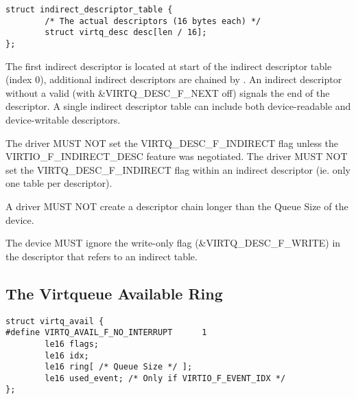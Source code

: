 \begin{lstlisting}
struct indirect_descriptor_table {
        /* The actual descriptors (16 bytes each) */
        struct virtq_desc desc[len / 16];
};
\end{lstlisting}

The first indirect descriptor is located at start of the indirect
descriptor table (index 0), additional indirect descriptors are
chained by . An indirect descriptor without a valid 
(with \&VIRTQ_DESC_F_NEXT off) signals the end of the descriptor.
A single indirect descriptor
table can include both device-readable and device-writable descriptors.

The driver MUST NOT set the VIRTQ_DESC_F_INDIRECT flag unless the
VIRTIO_F_INDIRECT_DESC feature was negotiated.   The driver MUST NOT
set the VIRTQ_DESC_F_INDIRECT flag within an indirect descriptor (ie. only
one table per descriptor).

A driver MUST NOT create a descriptor chain longer than the Queue Size of
the device.

The device MUST ignore the write-only flag (\&VIRTQ_DESC_F_WRITE) in the descriptor that refers to an indirect table.

\subsection{The Virtqueue Available Ring}\label{sec:Basic Facilities of a Virtio Device / Virtqueues / The Virtqueue Available Ring}

\begin{lstlisting}
struct virtq_avail {
#define VIRTQ_AVAIL_F_NO_INTERRUPT      1
        le16 flags;
        le16 idx;
        le16 ring[ /* Queue Size */ ];
        le16 used_event; /* Only if VIRTIO_F_EVENT_IDX */
};
\end{lstlisting}

